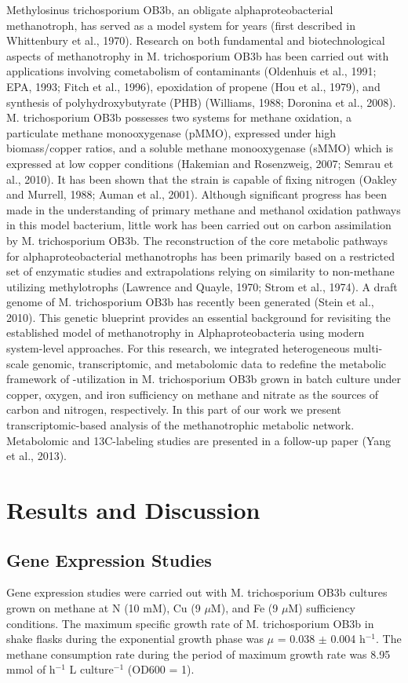 Methylosinus trichosporium OB3b, an obligate alphaproteobacterial methanotroph, has served as a model system for years (first described in Whittenbury et al., 1970).
Research on both fundamental and biotechnological aspects of methanotrophy in M. trichosporium OB3b has been carried out with applications involving cometabolism of contaminants (Oldenhuis et al., 1991; EPA, 1993; Fitch et al., 1996), epoxidation of propene (Hou et al., 1979), and synthesis of polyhydroxybutyrate (PHB) (Williams, 1988; Doronina et al., 2008).
M. trichosporium OB3b possesses two systems for methane oxidation, a particulate methane monooxygenase (pMMO), expressed under high biomass/copper ratios, and a soluble methane monooxygenase (sMMO) which is expressed at low copper conditions (Hakemian and Rosenzweig, 2007; Semrau et al., 2010).
It has been shown that the strain is capable of fixing nitrogen (Oakley and Murrell, 1988; Auman et al., 2001).
Although significant progress has been made in the understanding of primary methane and methanol oxidation pathways in this model bacterium, little work has been carried out on carbon assimilation by M. trichosporium OB3b.
The reconstruction of the core metabolic pathways for alphaproteobacterial methanotrophs has been primarily based on a restricted set of enzymatic studies and extrapolations relying on similarity to non-methane utilizing methylotrophs (Lawrence and Quayle, 1970; Strom et al., 1974).
A draft genome of M. trichosporium OB3b has recently been generated (Stein et al., 2010).
This genetic blueprint provides an essential background for revisiting the established model of methanotrophy in Alphaproteobacteria using modern system-level approaches.
For this research, we integrated heterogeneous multi-scale genomic, transcriptomic, and metabolomic data to redefine the metabolic framework of -utilization in M. trichosporium OB3b grown in batch culture under copper, oxygen, and iron sufficiency on methane and nitrate as the sources of carbon and nitrogen, respectively.
In this part of our work we present transcriptomic-based analysis of the methanotrophic metabolic network.
Metabolomic and 13C-labeling studies are presented in a follow-up paper (Yang et al., 2013).

\section{Results and Discussion}

\subsection{Gene Expression Studies}
Gene expression studies were carried out with M. trichosporium OB3b cultures grown on methane at N (10 mM), Cu (9 $\mu$M), and Fe (9 $\mu$M) sufficiency conditions.
The maximum specific growth rate of M. trichosporium OB3b in shake flasks during the exponential growth phase was $\mu$ = 0.038 $\pm$ 0.004 h$^{-1}$.
The methane consumption rate during the period of maximum growth rate was 8.95 mmol of  h$^{-1}$ L culture$^{-1}$ (OD600 = 1).

